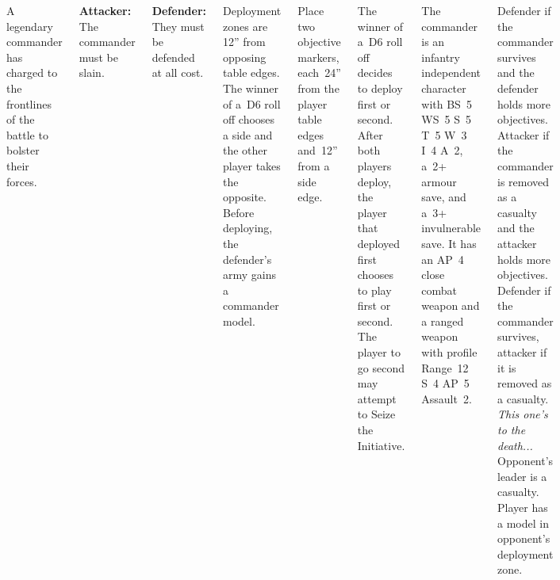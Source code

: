
\begin{columns}

  A legendary commander has charged to the frontlines of the battle to
  bolster their forces.

  {\bf Attacker:} The commander must be slain.

  {\bf Defender:} They must be defended at all cost.

%

Deployment zones are 12'' from opposing table edges.  The winner of
a~D6 roll off chooses a side and the other player takes the opposite.
Before deploying, the defender's army gains a commander model.

Place two objective markers, each~24'' from the player table edges
and~12'' from a side edge.

%

The winner of a~D6 roll off decides to deploy first or second.  After
both players deploy, the player that deployed first chooses to play
first or second.  The player to go second may attempt to Seize the
Initiative.

The commander is an infantry independent character with BS~5 WS~5 S~5
T~5 W~3 I~4 A~2, a~2+ armour save, and a~3+ invulnerable save.  It has
an AP~4 close combat weapon and a ranged weapon with profile Range~12
S~4 AP~5 Assault~2.

\scoringbox%
{Defender if the commander survives and the defender holds more
  objectives.  Attacker if the commander is removed as a casualty and
  the attacker holds more objectives.}%
{Defender if the commander survives, attacker if it is removed as a
  casualty.}%
{\emph{This one's to the death...}}%
{Opponent's leader is a casualty.}%
{Player has a model in opponent's deployment zone.}

\end{columns}
